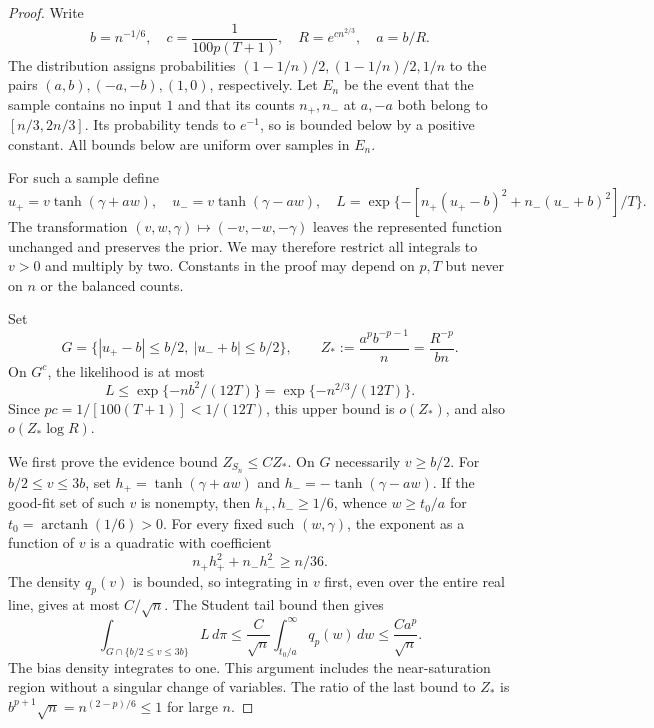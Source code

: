 \begin{proof}
Write
\[
 b=n^{-1/6},\quad c=\frac1{100p(T+1)},\quad
 R=e^{cn^{2/3}},\quad a=b/R.
\]
The distribution assigns probabilities $(1-1/n)/2,(1-1/n)/2,1/n$
to the pairs $(a,b),(-a,-b),(1,0)$, respectively.
Let $E_n$ be the event that the sample contains no input $1$ and that
its counts $n_+,n_-$ at $a,-a$ both belong to $[n/3,2n/3]$.
Its probability tends to $e^{-1}$, so is bounded below by a positive
constant. All bounds below are uniform over samples in $E_n$.

For such a sample define
\[
 u_+=v\tanh(\gamma+aw),\quad
 u_-=v\tanh(\gamma-aw),\quad
 L=\exp\{-[n_+(u_+-b)^2+n_-(u_-+b)^2]/T\}.
\]
The transformation $(v,w,\gamma)\mapsto(-v,-w,-\gamma)$ leaves
the represented function unchanged and preserves the prior. We may
therefore restrict all integrals to $v>0$ and multiply by two.
Constants in the proof may depend on $p,T$ but never on $n$ or the
balanced counts.

Set
\[
 G=\{|u_+-b|\le b/2,\ |u_-+b|\le b/2\},\qquad
 Z_*:=\frac{a^p b^{-p-1}}n=\frac{R^{-p}}{bn}.
\]
On $G^c$, the likelihood is at most
\begin{equation}\label{eq:raw-student-bad-fit}
 L\le \exp\{-nb^2/(12T)\}=\exp\{-n^{2/3}/(12T)\}.
\end{equation}
Since $pc=1/[100(T+1)]<1/(12T)$, this upper bound is
$o(Z_*)$, and also $o(Z_*\log R)$.

We first prove the evidence bound $Z_{S_n}\le C Z_*$.
On $G$ necessarily $v\ge b/2$. For $b/2\le v\le3b$, set
$h_+=\tanh(\gamma+aw)$ and $h_-=-\tanh(\gamma-aw)$.
If the good-fit set of such $v$ is nonempty, then
$h_+,h_-\ge1/6$, whence $w\ge t_0/a$ for
$t_0=\operatorname{arctanh}(1/6)>0$.
For every fixed such $(w,\gamma)$, the exponent as a function of $v$
is a quadratic with coefficient
\[
 n_+h_+^2+n_-h_-^2\ge n/36.
\]
The density $q_p(v)$ is bounded, so integrating in $v$ first, even
over the entire real line, gives at most $C/\sqrt n$.
The Student tail bound then gives
\begin{equation}\label{eq:raw-student-saturation}
 \int_{G\cap\{b/2\le v\le3b\}}L\,d\pi
 \le\frac C{\sqrt n}\int_{t_0/a}^\infty q_p(w)\,dw
 \le \frac{C a^p}{\sqrt n}.
\end{equation}
The bias density integrates to one. This argument includes the
near-saturation region without a singular change of variables.
The ratio of the last bound to $Z_*$ is
$b^{p+1}\sqrt n=n^{(2-p)/6}\le1$ for large $n$.


\end{proof}
